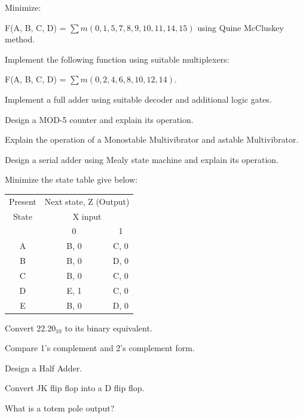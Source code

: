 \newpage \again

\item Minimize:

  F(A, B, C, D) = $\sum m(0, 1, 5, 7, 8, 9, 10, 11, 14, 15)$ using Quine
  McCluskey method.
\ene

\item \iitem Implement the following function using suitable multiplexers:

  F(A, B, C, D) = $\sum m(0, 2, 4, 6, 8, 10, 12, 14)$.
\Or
\item Implement a full adder using suitable decoder and additional logic
  gates.
\ene

\item \iitem Design a MOD-5 counter and explain its operation.
\Or
\item Explain the operation of a Monostable Multivibrator and astable
  Multivibrator.
\ene

\item \iitem Design a serial adder using Mealy state machine and explain
  its operation.
\Or
\item Minimize the state table give below:

\begin{flushleft}
  \hspace{1cm}\begin{tabular}{| c | c | c |}
  \hline
  {Present} & \multicolumn{2}{c|}{
  \rule{0ex}{2.5ex}Next state, Z (Output)}\\
  \cline{2-3}
   State & \multicolumn{2}{c|}{
  \rule{0ex}{2.5ex}X input}\\
  \hline
  & \ \ \ \ \ \ 0\ \ \ \ \ \ & 1 \\
  \hline
  A & B, 0 & C, 0 \\\hline
  B & B, 0 & D, 0 \\\hline
  C & B, 0 & C, 0 \\\hline
  D & E, 1 & C, 0 \\\hline
  E & B, 0 & D, 0 \\\hline
  
  \end{tabular}
\end{flushleft}
\ene

\markC
\ene

\newpage

\sub{\subj}
\maxtime

\partA

\iitem Convert 22.20$_\text{10}$ to its binary equivalent.
\item Compare 1's complement and 2's complement form.
\item Design a Half Adder.
\item Convert JK flip flop into a D flip flop.
\item What is a totem pole output?

